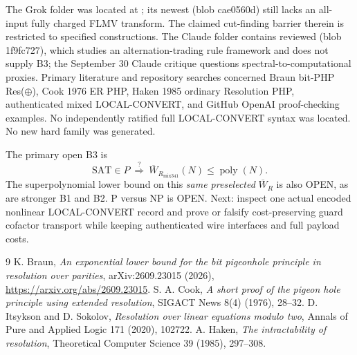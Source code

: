 \documentclass[11pt]{article}
\begin{document}
The Grok folder was located at ; its newest  (blob cae0560d) still lacks an all-input fully charged FLMV transform. The claimed cut-finding barrier therein is restricted to specified constructions. The Claude folder  contains reviewed  (blob 1f9fc727), which studies an alternation-trading rule framework and does not supply B3; the September 30 Claude critique questions spectral-to-computational proxies. Primary literature and repository searches concerned Braun bit-PHP Res($\oplus$), Cook 1976 ER PHP, Haken 1985 ordinary Resolution PHP, authenticated mixed LOCAL-CONVERT, and GitHub OpenAI proof-checking examples. No independently ratified full LOCAL-CONVERT syntax was located. No new hard family was generated.

The primary open B3 is
\[
\mathrm{SAT}\in P\ \stackrel{?}{\Longrightarrow}\ 
\overline W_{R_{\mathrm{mix341}}}(N)\le\operatorname{poly}(N).
\]
The superpolynomial lower bound on this \emph{same preselected} $\overline W_R$ is also OPEN, as are stronger B1 and B2. P versus NP is OPEN. Next: inspect one actual encoded nonlinear LOCAL-CONVERT record and prove or falsify cost-preserving guard cofactor transport while keeping authenticated wire interfaces and full payload costs.

\begin{thebibliography}{9}
 K. Braun, \emph{An exponential lower bound for the bit pigeonhole principle in resolution over parities}, arXiv:2609.23015 (2026), \url{https://arxiv.org/abs/2609.23015}.
\bibitem{Cook} S. A. Cook, \emph{A short proof of the pigeon hole principle using extended resolution}, SIGACT News 8(4) (1976), 28--32.
\bibitem{ItsyksonSokolov} D. Itsykson and D. Sokolov, \emph{Resolution over linear equations modulo two}, Annals of Pure and Applied Logic 171 (2020), 102722.
\bibitem{Haken} A. Haken, \emph{The intractability of resolution}, Theoretical Computer Science 39 (1985), 297--308.
\end{thebibliography}
\end{document}
